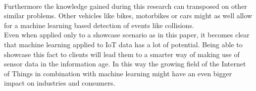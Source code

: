 \\
Furthermore the knowledge gained during this research can transposed on other similar problems. Other vehicles like bikes, motorbikes or cars might as well allow for a machine learning based detection of events like collisions. 
\\
Even when applied only to a showcase scenario as in this paper, it becomes clear that machine learning applied to IoT data has a lot of potential. Being able to showcase this fact to clients will lead them to a smarter way of making use of sensor data in the information age. In this way the growing field of the Internet of Things in combination with machine learning might have an even bigger impact on industries and consumers.
\\